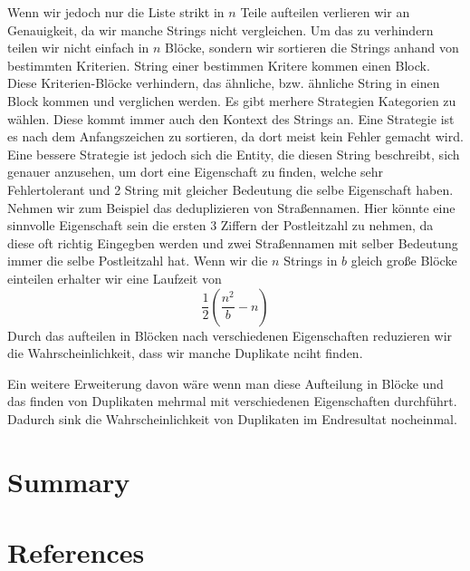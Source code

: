\documentclass[sigconf]{acmart}
\begin{document}
Wenn wir jedoch nur die Liste strikt in $n$
Teile aufteilen verlieren wir an Genauigkeit, da wir
manche Strings nicht vergleichen.
Um das zu verhindern teilen wir nicht einfach in $n$
Blöcke, sondern wir sortieren die Strings anhand von 
bestimmten Kriterien. String einer bestimmen Kritere kommen
einen Block. Diese Kriterien-Blöcke verhindern, das
ähnliche, bzw. ähnliche String in einen Block kommen 
und verglichen werden.
Es gibt merhere Strategien Kategorien zu wählen. Diese
kommt immer auch den Kontext des Strings an.
Eine Strategie ist es nach dem Anfangszeichen zu 
sortieren, da dort meist kein Fehler gemacht wird.
Eine bessere Strategie ist jedoch sich die Entity,
die diesen String beschreibt, sich genauer anzusehen,
um dort eine Eigenschaft zu finden, welche sehr 
Fehlertolerant und 2 String mit gleicher Bedeutung
die selbe Eigenschaft haben.
Nehmen wir zum Beispiel das deduplizieren von 
Straßennamen. Hier könnte eine sinnvolle
Eigenschaft sein die ersten 3 Ziffern der 
Postleitzahl zu nehmen, da diese oft richtig 
Eingegben werden und zwei Straßennamen mit selber
Bedeutung immer die selbe Postleitzahl hat.
Wenn wir die $n$ Strings in $b$ gleich große Blöcke
einteilen erhalter wir eine Laufzeit von
$$\frac{1}{2} (\frac{n^2}{b}-n)$$
Durch das aufteilen in Blöcken nach verschiedenen
Eigenschaften reduzieren wir die Wahrscheinlichkeit,
dass wir manche Duplikate nciht finden.

Ein weitere Erweiterung davon wäre wenn man diese
Aufteilung in Blöcke und das finden von Duplikaten
mehrmal mit verschiedenen Eigenschaften durchführt.
Dadurch sink die Wahrscheinlichkeit von Duplikaten
im Endresultat nocheinmal.

\section*{Summary}

\section*{References}
\end{document}
